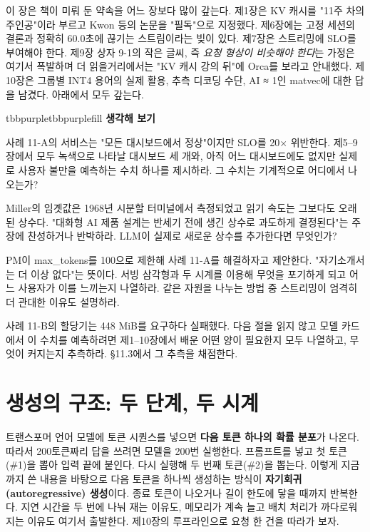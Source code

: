 이 장은 책이 미뤄 둔 약속을 어느 장보다 많이 갚는다. 제1장은 KV 캐시를 "11주 차의 주인공"이라 부르고 Kwon 등의 논문을 "필독"으로 지정했다. 제6장에는 고정 세션의 결론과 정확히 60.0초에 끊기는 스트림이라는 빚이 있다. 제7장은 스트리밍에 SLO를 부여해야 한다. 제9장 상자 9-1의 작은 글씨, 즉 \textit{요청 형상이 비슷해야 한다}는 가정은 여기서 폭발하며 더 읽을거리에서는 "KV 캐시 강의 뒤"에 Orca를 보라고 안내했다. 제10장은 그룹별 INT4 용어의 실제 활용, 추측 디코딩 수단, AI ≈ 1인 matvec에 대한 답을 남겼다. 아래에서 모두 갚는다.

\begin{calloutbox}{tbbpurple}{tbbpurplefill}
{\normalsize\bfseries\color{tbbpurple}생각해 보기}\par\vspace{3pt}
\begin{tbbitemize}
  \item 사례 11-A의 서비스는 "모든 대시보드에서 정상"이지만 SLO를 20× 위반한다. 제5–9장에서 모두 녹색으로 나타날 대시보드 세 개와, 아직 어느 대시보드에도 없지만 실제로 사용자 불만을 예측하는 수치 하나를 제시하라. 그 수치는 기계적으로 어디에서 나오는가?
  \item Miller의 임곗값은 1968년 시분할 터미널에서 측정되었고 읽기 속도는 그보다도 오래된 상수다. "대화형 AI 제품 설계는 반세기 전에 생긴 상수로 과도하게 결정된다"는 주장에 찬성하거나 반박하라. LLM이 실제로 새로운 상수를 추가한다면 무엇인가?
  \item PM이 max\_tokens를 100으로 제한해 사례 11-A를 해결하자고 제안한다. "자기소개서는 더 이상 없다"는 뜻이다. 서빙 삼각형과 두 시계를 이용해 무엇을 포기하게 되고 어느 사용자가 이를 느끼는지 나열하라. 같은 자원을 나누는 방법 중 스트리밍이 엄격히 더 관대한 이유도 설명하라.
  \item 사례 11-B의 할당기는 448 MiB를 요구하다 실패했다. 다음 절을 읽지 않고 모델 카드에서 이 수치를 예측하려면 제1–10장에서 배운 어떤 양이 필요한지 모두 나열하고, 무엇이 커지는지 추측하라. §11.3에서 그 추측을 채점한다.
\end{tbbitemize}
\end{calloutbox}

\section{생성의 구조: 두 단계, 두 시계}

트랜스포머 언어 모델에 토큰 시퀀스를 넣으면 \textbf{다음 토큰 하나의 확률 분포}가 나온다. 따라서 200토큰짜리 답을 쓰려면 모델을 200번 실행한다. 프롬프트를 넣고 첫 토큰(\#1)을 뽑아 입력 끝에 붙인다. 다시 실행해 두 번째 토큰(\#2)을 뽑는다. 이렇게 지금까지 쓴 내용을 바탕으로 다음 토큰을 하나씩 생성하는 방식이 \textbf{자기회귀(autoregressive) 생성}이다. 종료 토큰이 나오거나 길이 한도에 닿을 때까지 반복한다. 지연 시간을 두 번에 나눠 재는 이유도, 메모리가 계속 늘고 배치 처리가 까다로워지는 이유도 여기서 출발한다. 제10장의 루프라인으로 요청 한 건을 따라가 보자.

